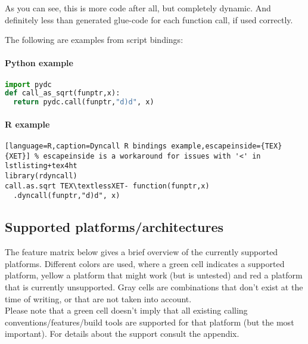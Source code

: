 As you can see, this is more code after all, but completely dynamic.
And definitely less than generated glue-code for each function call, if
used correctly.

The following are examples from script bindings:

\paragraph{Python example}

\begin{lstlisting}[language=python,caption=Dyncall Python bindings example]
import pydc
def call_as_sqrt(funptr,x):
  return pydc.call(funptr,"d)d", x)
\end{lstlisting}


\paragraph{R example}

\begin{lstlisting}[language=R,caption=Dyncall R bindings example,escapeinside={TEX}{XET}] % escapeinside is a workaround for issues with '<' in lstlisting+tex4ht
library(rdyncall)
call.as.sqrt TEX\textlessXET- function(funptr,x)
  .dyncall(funptr,"d)d", x)
\end{lstlisting}


\pagebreak

\subsection{Supported platforms/architectures}

The feature matrix below gives a brief overview of the currently supported
platforms. Different colors are used, where a green cell indicates a supported
platform, yellow a platform that might work (but is untested) and red a platform
that is currently unsupported. Gray cells are combinations that don't exist
at the time of writing, or that are not taken into account.\\
Please note that a green cell doesn't imply that all existing calling
conventions/features/build tools are supported for that platform (but the most important).
For details about the support consult the appendix.

